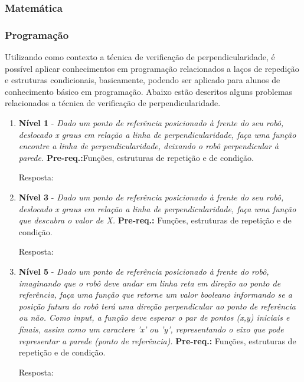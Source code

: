 		\subsubsection{Matemática}
		\label{sec:tec1_mat}
		
		\subsubsection{Programação}
		\label{sec:tec1_prog}

			Utilizando como contexto a técnica de verificação de perpendicularidade, é possível aplicar conhecimentos em programação relacionados a laços de repedição e estruturas condicionais, basicamente, podendo ser aplicado para alunos de conhecimento básico em programação. Abaixo estão descritos alguns problemas relacionados a técnica de verificação de perpendicularidade.

			\begin{enumerate}
				\item \textbf{Nível 1} - \textit{Dado um ponto de referência posicionado à frente do seu robô, deslocado x graus em relação a linha de perpendicularidade, faça uma função encontre a linha de perpendicularidade, deixando o robô perpendicular à parede.} \textbf{Pre-req.:}Funções, estruturas de repetição e de condição.

				Resposta:


				\item \textbf{Nível 3} - \textit{Dado um ponto de referência posicionado à frente do seu robô, deslocado x graus em relação a linha de perpendicularidade, faça uma função que descubra o valor de X.} \textbf{Pre-req.:} Funções, estruturas de repetição e de condição.

				Resposta:

				\item \textbf{Nível 5} - \textit{Dado um ponto de referência posicionado à frente do robô, imaginando que o robô deve andar em linha reta em direção ao ponto de referência, faça uma função que retorne um valor booleano informando se a posição futura do robô terá uma direção perpendicular ao ponto de referência ou não. Como input, a função deve esperar o par de pontos (x,y) iniciais e finais, assim como um caractere 'x' ou 'y', representando o eixo que pode representar a parede (ponto de referência).} \textbf{Pre-req.:} Funções, estruturas de repetição e de condição.

				Resposta:

			\end{enumerate} 
		
